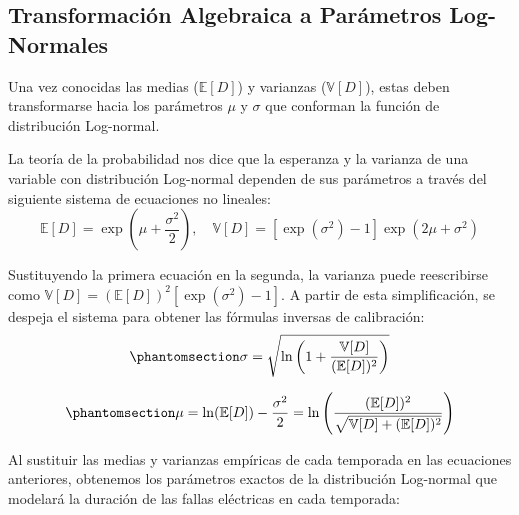 \documentclass[
  spanish,
  us-letterpaper,
]{scrreprt}
\numberwithin{equation}{section}
\theoremstyle{plain}
\theoremstyle{plain}
\theoremstyle{definition}
\theoremstyle{plain}
\theoremstyle{remark}
\begin{document}
\subsection{Transformación Algebraica a Parámetros
Log-Normales}\label{transformaciuxf3n-algebraica-a-paruxe1metros-log-normales}

Una vez conocidas las medias (\(\mathbb{E}[D]\)) y varianzas
(\(\mathbb{V}[D]\)), estas deben transformarse hacia los parámetros
\(\mu\) y \(\sigma\) que conforman la función de distribución
Log-normal.

La teoría de la probabilidad nos dice que la esperanza y la varianza de
una variable con distribución Log-normal dependen de sus parámetros a
través del siguiente sistema de ecuaciones no lineales: \[
\mathbb{E}[D] = \exp\left(\mu + \frac{\sigma^2}{2}\right), \quad \mathbb{V}[D] = \left[\exp(\sigma^2) - 1\right] \exp(2\mu + \sigma^2)
\]

Sustituyendo la primera ecuación en la segunda, la varianza puede
reescribirse como
\(\mathbb{V}[D] = (\mathbb{E}[D])^2 \left[\exp(\sigma^2) - 1\right]\). A
partir de esta simplificación, se despeja el sistema para obtener las
fórmulas inversas de calibración:
\begin{equation}\phantomsection\label{eq-sigma-lognormal}{
\sigma = \sqrt{\ln\left(1 + \frac{\mathbb{V}[D]}{(\mathbb{E}[D])^2}\right)}
}\end{equation}

\begin{equation}\phantomsection\label{eq-mu-lognormal}{
\mu = \ln(\mathbb{E}[D]) - \frac{\sigma^2}{2} = \ln\left( \frac{(\mathbb{E}[D])^2}{\sqrt{\mathbb{V}[D] + (\mathbb{E}[D])^2}} \right)
}\end{equation}

Al sustituir las medias y varianzas empíricas de cada temporada en las
ecuaciones anteriores, obtenemos los parámetros exactos de la
distribución Log-normal que modelará la duración de las fallas
eléctricas en cada temporada:
\end{document}
